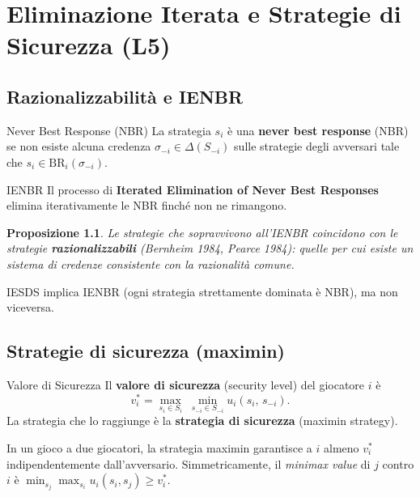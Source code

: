 \documentclass[12pt,a4paper,twoside]{book}
\theoremstyle{plain}
\newtheorem{proposition}[theorem]{Proposizione}
\theoremstyle{definition}
\newcommand{\BR}{\mathrm{BR}}
\begin{document}
\chapter{Eliminazione Iterata e Strategie di Sicurezza (L5)}

\section{Razionalizzabilità e IENBR}

\begin{defbox}{Never Best Response (NBR)}
La strategia $s_i$ è una \textbf{never best response} (NBR) se non esiste alcuna credenza $\sigma_{-i}\in\Delta(S_{-i})$ sulle strategie degli avversari tale che $s_i\in\BR_i(\sigma_{-i})$.
\end{defbox}

\begin{defbox}{IENBR}
Il processo di \textbf{Iterated Elimination of Never Best Responses} elimina iterativamente le NBR finché non ne rimangono.
\end{defbox}

\begin{proposition}
Le strategie che sopravvivono all'IENBR coincidono con le strategie \textbf{razionalizzabili} (Bernheim 1984, Pearce 1984): quelle per cui esiste un sistema di credenze consistente con la razionalità comune.
\end{proposition}

IESDS implica IENBR (ogni strategia strettamente dominata è NBR), ma non viceversa.

\section{Strategie di sicurezza (maximin)}

\begin{defbox}{Valore di Sicurezza}
Il \textbf{valore di sicurezza} (security level) del giocatore $i$ è
\[
  v_i^* = \max_{s_i\in S_i}\; \min_{s_{-i}\in S_{-i}} u_i(s_i,\, s_{-i}).
\]
La strategia che lo raggiunge è la \textbf{strategia di sicurezza} (maximin strategy).
\end{defbox}

In un gioco a due giocatori, la strategia maximin garantisce a $i$ almeno $v_i^*$ indipendentemente dall'avversario. Simmetricamente, il \emph{minimax value} di $j$ contro $i$ è $\min_{s_j}\max_{s_i} u_i(s_i,s_j) \ge v_i^*$.
\end{document}

